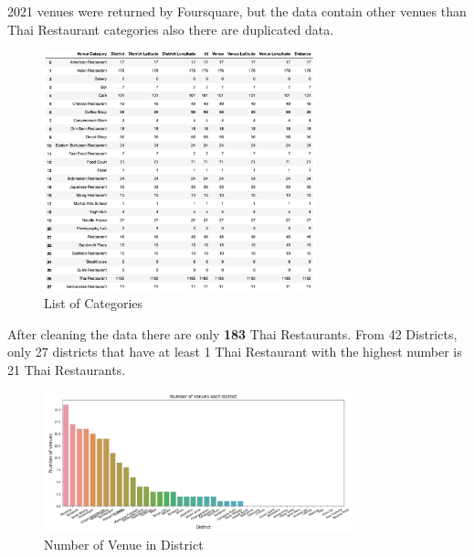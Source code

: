 \documentclass[12pt,a4paper]{article}
\begin{document}
2021 venues were returned by Foursquare, but the data contain other venues than Thai Restaurant categories also there are duplicated data. 

\begin{center}
    \begin{figure}[htp]
    \begin{center}
     \includegraphics[width=0.7\textwidth]{fig/categories}
    \end{center}
    \caption{List of Categories}
    \label{fig:categories}
    \end{figure}
\end{center}

After cleaning the data there are only \textbf{183} Thai Restaurants. From 42 Districts, only 27 districts that have at least 1 Thai Restaurant with the highest number is 21 Thai Restaurants.

\begin{center}
    \begin{figure}[htp]
    \begin{center}
     \includegraphics[width=0.8\textwidth]{fig/venue_district}
    \end{center}
    \caption{Number of Venue in District}
    \label{fig:venue_district}
    \end{figure}
\end{center}
 
\end{document}
